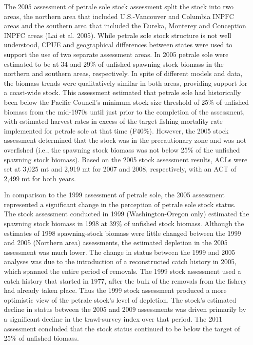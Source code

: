 \documentclass[11pt,
  english,
  letterpaper,
]{article}
\begin{document}
The 2005 assessment of petrale sole stock assessment split the stock into two areas, the northern area that included U.S.-Vancouver and Columbia INPFC areas and the southern area that included the Eureka, Monterey and Conception INPFC areas (Lai et al. 2005). While petrale sole stock structure is not well understood, CPUE and geographical differences between states were used to support the use of two separate assessment areas. In 2005 petrale sole were estimated to be at 34 and 29\% of unfished spawning stock biomass in the northern and southern areas, respectively. In spite of different models and data, the biomass trends were qualitatively similar in both areas, providing support for a coast-wide stock. This assessment estimated that petrale sole had historically been below the Pacific Council's minimum stock size threshold of 25\% of unfished biomass from the mid-1970s until just prior to the completion of the assessment, with estimated harvest rates in excess of the target fishing mortality rate implemented for petrale sole at that time (F40\%). However, the 2005 stock assessment determined that the stock was in the precautionary zone and was not overfished (i.e., the spawning stock biomass was not below 25\% of the unfished spawning stock biomass). Based on the 2005 stock assessment results, ACLs were set at 3,025 mt and 2,919 mt for 2007 and 2008, respectively, with an ACT of 2,499 mt for both years.

In comparison to the 1999 assessment of petrale sole, the 2005 assessment represented a significant change in the perception of petrale sole stock status. The stock assessment conducted in 1999 (Washington-Oregon only) estimated the spawning stock biomass in 1998 at 39\% of unfished stock biomass. Although the estimates of 1998 spawning-stock biomass were little changed between the 1999 and 2005 (Northern area) assessments, the estimated depletion in the 2005 assessment was much lower. The change in status between the 1999 and 2005 analyses was due to the introduction of a reconstructed catch history in 2005, which spanned the entire period of removals. The 1999 stock assessment used a catch history that started in 1977, after the bulk of the removals from the fishery had already taken place. Thus the 1999 stock assessment produced a more optimistic view of the petrale stock's level of depletion. The stock's estimated decline in status between the 2005 and 2009 assessments was driven primarily by a significant decline in the trawl-survey index over that period. The 2011 assessment concluded that the stock status continued to be below the target of 25\% of unfished biomass.
\end{document}
